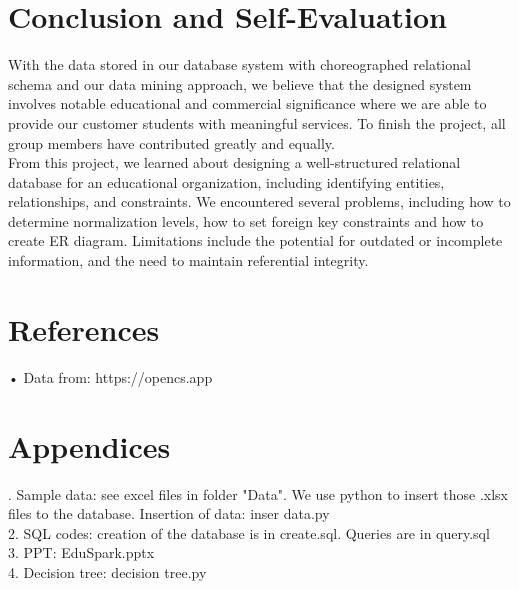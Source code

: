 \documentclass[12pt, a4paper]{article}
\begin{document}
\begin{spacing}{1.32}
\section{Conclusion and Self-Evaluation}

With the data stored in our database system with choreographed relational schema and our data mining approach, we believe that the designed system involves notable educational and commercial significance where we are able to provide our customer students with meaningful services. To finish the project, all group members have contributed greatly and equally.\\

From this project, we learned about designing a well-structured relational database for an educational organization, including identifying entities, relationships, and constraints. We encountered several problems, including how to determine normalization levels, how to set foreign key constraints and how to create ER diagram. Limitations include the potential for outdated or incomplete information, and the need to maintain referential integrity.

\section{References}
• Data from: https://opencs.app

\section{Appendices}
. Sample data: see excel files in folder "Data". We use python to insert those .xlsx files to the database. Insertion of data: inser data.py\\
2. SQL codes: creation of the database is in create.sql. Queries are in query.sql\\
3. PPT: EduSpark.pptx\\
4. Decision tree: decision tree.py\\
\end{spacing}

\end{document}
